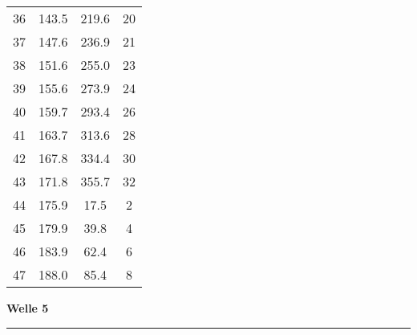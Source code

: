 \documentclass[10pt, a4paper]{article}
\begin{document}
\begin{center}
\begin{tabular}{c|c|c|c}
		36 & 143.5 & 219.6 & 20 \\
		37 & 147.6 & 236.9 & 21 \\
		38 & 151.6 & 255.0 & 23 \\
		39 & 155.6 & 273.9 & 24 \\
		40 & 159.7 & 293.4 & 26 \\
		41 & 163.7 & 313.6 & 28 \\
		42 & 167.8 & 334.4 & 30 \\
		43 & 171.8 & 355.7 & 32 \\
		44 & 175.9 & 17.5 & 2 \\
		45 & 179.9 & 39.8 & 4 \\
		46 & 183.9 & 62.4 & 6 \\
		47 & 188.0 & 85.4 & 8 \\
	\end{tabular}
\end{center}
\newpage
\centerline{{\bf Welle 5} }
\rule{1.0\textwidth}{0.5mm}
\end{document}

